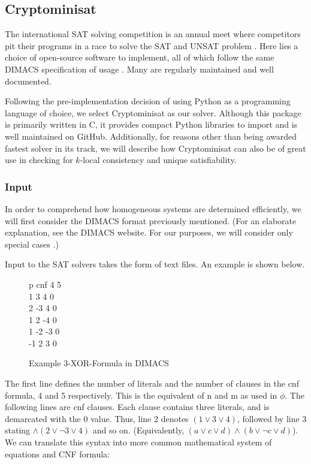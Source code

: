\subsection{Cryptominisat}
The international SAT solving competition is an annual meet where competitors pit their programs in a race to solve the SAT and UNSAT problem \cite{sat_competitions_2017}. Here lies a choice of open-source software to implement, all of which follow the same DIMACS specification of usage \cite{dimacs_2017}. Many are regularly maintained and well documented.
\par
Following the pre-implementation decision of using Python as a programming language of choice, we select Cryptominisat as our solver. Although this package is primarily written in C, it provides compact Python libraries to import and is well maintained on GitHub. Additionally, for reasons other than being awarded fastest solver in its track, we will describe how Cryptominisat can also be of great use in checking for $k$-local consistency and unique satisfiability.

\subsubsection{Input}
In order to comprehend how homogeneous systems are determined efficiently, we will first consider the DIMACS format previously mentioned. (For an elaborate explanation, see the DIMACS website. For our purposes, we will consider only special cases \cite{dimacs_2017}.)
\par
Input to the SAT solvers takes the form of text files. An example is shown below.
\begin{figure}[htbp!]
	\captionsetup{justification=justified, singlelinecheck=false}
	p cnf 4 5 \\
	1 3 4 0 \\
	2 -3 4 0 \\
	1 2 -4 0 \\
	1 -2 -3 0 \\
	-1 2 3 0 \\
	\caption{Example 3-XOR-Formula in DIMACS}
\end{figure}
\par
The first line defines the number of literals and the number of clauses in the cnf formula, 4 and 5 respectively. This is the equivalent of n and m as used in $\phi$. The following lines are cnf clauses. Each clause contains three literals, and is demarcated with the 0 value. Thus, line 2 denotes $(1 \lor 3 \lor 4)$, followed by line 3 stating $\land (2 \lor \lnot3 \lor 4)$ and so on. (Equivalently, $(a \lor c \lor d) \land (b \lor \lnot c \lor d)$). We can translate this syntax into more common mathematical system of equations and CNF formula:

